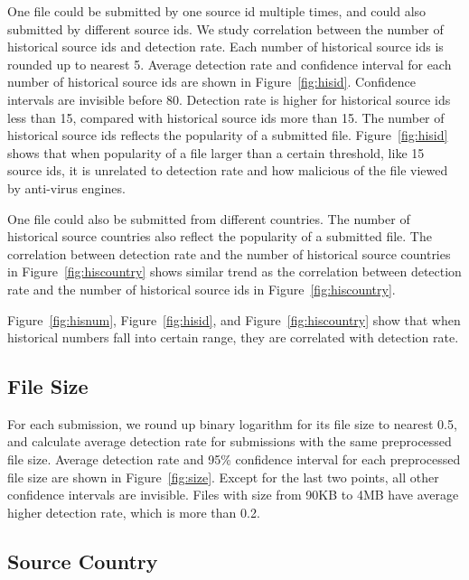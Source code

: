 One file could be submitted by one source id multiple times, 
and could also submitted by different source ids. 
We study correlation between the number of historical source ids and detection rate. 
Each number of historical source ids is rounded up to nearest 5. 
Average detection rate and confidence interval for each number of historical source ids are shown in Figure~\ref{fig:hisid}. 
Confidence intervals are invisible before 80. 
Detection rate is higher for historical source ids less than 15, compared with historical source ids more than 15.
The number of historical source ids reflects the popularity of a submitted file.
Figure~\ref{fig:hisid} shows that when popularity of a file larger than a certain threshold, like 15 source ids, 
it is unrelated to detection rate and how malicious of the file viewed by anti-virus engines. 


One file could also be submitted from different countries. 
The number of historical source countries also reflect the popularity of a submitted file. 
The correlation between detection rate and the number of historical source countries in 
Figure~\ref{fig:hiscountry} shows similar trend as the correlation between detection rate 
and the number of historical source ids in Figure~\ref{fig:hiscountry}. 

Figure~\ref{fig:hisnum}, Figure~\ref{fig:hisid}, and Figure~\ref{fig:hiscountry} show that 
when historical numbers fall into certain range, they are correlated with detection rate. 

\subsection{File Size}
\label{sec:size}

For each submission, we round up binary logarithm for its file size to nearest 0.5,
and calculate average detection rate for submissions with the same preprocessed file size.
Average detection rate and 95\% confidence interval for each preprocessed 
file size are shown in Figure~\ref{fig:size}.
Except for the last two points, all other confidence intervals are invisible.   
Files with size from 90KB to 4MB have average higher detection rate, which is more than 0.2. 

\subsection{Source Country}
\label{sec:country}

